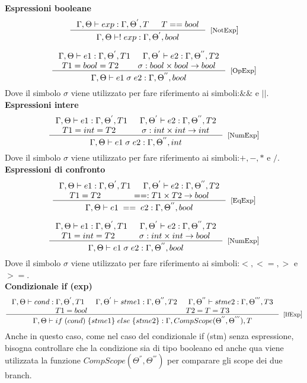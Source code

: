 \textbf{Espressioni booleane} 
\[
\inference{\Gamma, \Theta \vdash exp: \Gamma, \Theta^{'}, T & T==bool}{\Gamma, \Theta \vdash !\; exp: \Gamma, \Theta^{'}, bool}[[NotExp]]
\]

\[
\inference{\Gamma, \Theta \vdash e1:\Gamma, \Theta^{'}, T1 & \Gamma, \Theta^{'} \vdash e2:\Gamma, \Theta^{''}, T2 \\ T1 = bool = T2 & \sigma: bool \times bool \rightarrow bool}{\Gamma, \Theta \vdash e1 \; \sigma \; e2: \Gamma, \Theta^{''}, bool}[[OpExp]]
\]
Dove il simbolo $\sigma$ viene utilizzato per fare riferimento ai simboli:$\&\&$ e $||$. \\

\textbf{Espressioni intere} 
\[
\inference{\Gamma, \Theta \vdash e1:\Gamma, \Theta^{'}, T1 & \Gamma, \Theta^{'} \vdash e2:\Gamma, \Theta^{''}, T2 \\ T1 = int = T2 & \sigma: int \times int \rightarrow int}{\Gamma, \Theta \vdash e1 \; \sigma \; e2: \Gamma, \Theta^{''}, int}[[NumExp]]
\]
Dove il simbolo $\sigma$ viene utilizzato per fare riferimento ai simboli:$+, -, *$ e $/$. \\

\textbf{Espressioni di confronto} 
\[
\inference{\Gamma, \Theta \vdash e1:\Gamma, \Theta^{'}, T1 & \Gamma, \Theta^{'} \vdash e2:\Gamma, \Theta^{''}, T2 \\ T1 = T2 & ==: T1 \times T2 \rightarrow bool}{\Gamma, \Theta \vdash e1 \; == \; e2: \Gamma, \Theta^{''}, bool}[[EqExp]]
\]

\[
\inference{\Gamma, \Theta \vdash e1:\Gamma, \Theta^{'}, T1 & \Gamma, \Theta^{'} \vdash e2:\Gamma, \Theta^{''}, T2 \\ T1 = int = T2 & \sigma: int \times int \rightarrow bool}{\Gamma, \Theta \vdash e1 \; \sigma \; e2: \Gamma, \Theta^{''}, bool}[[NumExp]]
\]
Dove il simbolo $\sigma$ viene utilizzato per fare riferimento ai simboli:$<, <=, >$ e $>=$. \\


\textbf{Condizionale if (exp)} 
\[
\inference{\Gamma, \Theta \vdash cond:\Gamma, \Theta^{'}, T1 & \Gamma, \Theta^{'} \vdash stme1:\Gamma, \Theta^{''}, T2 & \Gamma, \Theta^{''} \vdash stme2:\Gamma, \Theta^{'''}, T3 \\ T1 = bool & T2 = T = T3}{\Gamma, \Theta \vdash if\; (cond)\; \{ stme1 \}\; else\; \{stme2\}: \Gamma, CompScope(\Theta^{''}, \Theta^{'''}), T}[[IfExp]]
\]
Anche in questo caso, come nel caso del condizionale if (stm) senza espressione, bisogna controllare che la condizione sia di tipo booleano ed anche qua viene utilizzata la funzione $CompScope(\Theta^{''}, \Theta^{'''})$ per comparare gli scope dei due branch. \\

